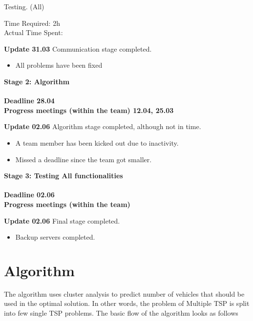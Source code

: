 \documentclass{article}
\begin{document}
\begin{itemize}
\begin{itemize}
\begin{enumerate}
			
					{\bf \item Testing. (All) \\}
					Time Required: 2h \\ 
					Actual Time Spent: \\
										
			\end{enumerate}

	\end{itemize}

	{\large \bf	Update 31.03}
	Communication stage completed.
	\begin{itemize}
		\item All problems have been fixed
	\end{itemize}
	
	
	\newpage

{\item \large \bf Stage 2: Algorithm \\ \\
	Deadline 28.04 \\
	Progress meetings (within the team) 12.04, 25.03 \\}
	
	{\large \bf	Update 02.06}
	Algorithm stage completed, although not in time.

	\begin{itemize}
		\item A team member has been kicked out due to inactivity.
		\item Missed a deadline since the team got smaller.
	\end{itemize}


{\item \large \bf Stage 3: Testing All functionalities \\ \\
	Deadline 02.06 \\
	Progress meetings (within the team) \\}


\end{itemize}

	{\large \bf	Update 02.06}
	Final stage completed.

	\begin{itemize}
		\item Backup servers completed.
	\end{itemize}

\section{Algorithm}
The algorithm uses cluster analysis to predict number of vehicles that should be used in the optimal solution. In other words, the problem of Multiple TSP is split into few single TSP problems. The basic flow of the algorithm looks as follows
\end{document}
